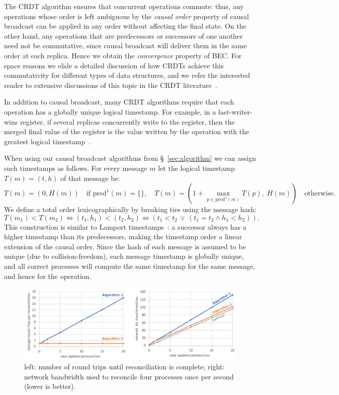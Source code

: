 \documentclass[a4paper,anonymous,USenglish]{lipics-v2019}
\begin{document}
The CRDT algorithm ensures that concurrent operations commute: thus, any operations whose order is left ambiguous by the \emph{causal order} property of causal broadcast can be applied in any order without affecting the final state.
On the other hand, any operations that are predecessors or successors of one another need not be commutative, since causal broadcast will deliver them in the same order at each replica.
Hence we obtain the \emph{convergence} property of BEC.
For space reasons we elide a detailed discussion of how CRDTs achieve this commutativity for different types of data structures, and we refer the interested reader to extensive discussions of this topic in the CRDT literature~\cite{Gomes:2017gy,Shapiro:2011wy,Weiss:2009ht}.

In addition to causal broadcast, many CRDT algorithms require that each operation has a globally unique logical timestamp.
For example, in a last-writer-wins register, if several replicas concurrently write to the register, then the merged final value of the register is the value written by the operation with the greatest logical timestamp~\cite{Shapiro:2011wy}.

When using our causal broadcast algorithms from \S~\ref{sec:algorithm} we can assign such timestamps as follows.
For every message $m$ let the logical timestamp $T(m) = (t, h)$ of that message be:
\[ T(m) = (0, H(m)) \quad\text{if } \mathrm{pred}^1(m) = \{\}, \quad
T(m) = \left(1 + \max_{p \in \mathrm{pred}^1(m)} T(p),\; H(m)\right) \quad\text{otherwise.} \]
We define a total order lexicographically by breaking ties using the message hash:
\[ T(m_1) < T(m_2) \iff (t_1, h_1) < (t_2, h_2) \iff (t_1 < t_2 \,\vee\, (t_1 = t_2 \wedge h_1 < h_2)). \]
This construction is similar to Lamport timestamps~\cite{Lamport:1978}: a successor always has a higher timestamp than its predecessors, making the timestamp order a linear extension of the causal order.
Since the hash of each message is assumed to be unique (due to collision-freedom), each message timestamp is globally unique, and all correct processes will compute the same timestamp for the same message, and hence for the operation.

\begin{figure}
  \includegraphics[width=\textwidth,keepaspectratio=true]{figs/evaluation.pdf}
  \caption{left: number of round trips until reconciliation is complete; right: network bandwidth used to reconcile four processes once per second (lower is better).}
  \label{fig:evaluation}
\end{figure}
\end{document}
